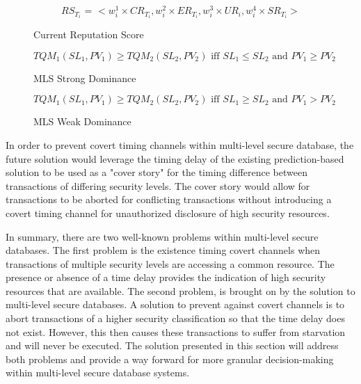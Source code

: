\begin{figure}[h]
\captionsetup{justification=centering}
\centering %

\[\textrm{$RS_{T_{i}}$ = $<w_{i}^{1}\times CR_{T_{i}},w_{i}^{2}\times ER_{T_{i}},w_{i}^{3}\times UR_{i},w_{i}^{4}\times SR_{T_{i}}>$}\]

\caption{Current Reputation Score} %
\label{fig:existing_reputation_score} %

\end{figure}

\begin{figure}[h]
\captionsetup{justification=centering}
\centering %

\[\textrm{
$TQM_{1}(SL_{1},PV_{1}) \geq TQM_{2}(SL_{2},PV_{2})$ iff $SL_{1} \leq SL_{2}$ and $PV_{1} \geq PV_{2}$}\]

\caption{MLS Strong Dominance} %
\label{fig:mls_strong_dominance} %

\end{figure}

\begin{figure}[h]
\captionsetup{justification=centering}
\centering %

\[\textrm{
$TQM_{1}(SL_{1},PV_{1}) \geq TQM_{2}(SL_{2},PV_{2})$ iff $SL_{1} \geq SL_{2}$ and $PV_{1} > PV_{2}$}\]

\caption{MLS Weak Dominance} %
\label{fig:mls_weak_dominance} %

\end{figure}

In order to prevent covert timing channels within multi-level secure database, the future solution would leverage the timing delay of the existing prediction-based solution to be used as a "cover story" for the timing difference between transactions of differing security levels. The cover story would allow for transactions to be aborted for conflicting transactions without introducing a covert timing channel for unauthorized disclosure of high security resources.

In summary, there are two well-known problems within multi-level secure databases. The first problem is the existence timing covert channels when transactions of multiple security levels are accessing a common resource. The presence or absence of a time delay provides the indication of high security resources that are available. The second problem, is brought on by the solution to multi-level secure databases. A solution to prevent against covert channels is to abort transactions of a higher security classification so that the time delay does not exist. However, this then causes these transactions to suffer from starvation and will never be executed. The solution presented in this section will address both problems and provide a way forward for more granular decision-making within multi-level secure database systems.

